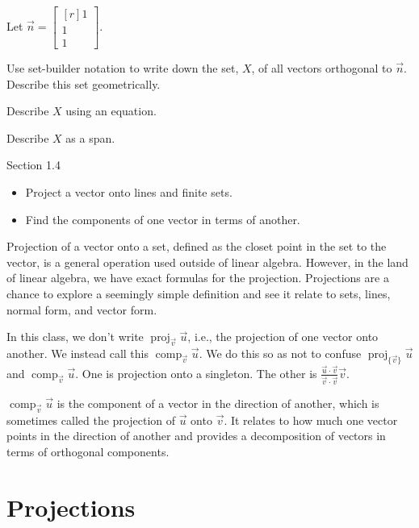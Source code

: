 \documentclass{problemset}
\DeclareMathOperator{\Comp}{comp}
\DeclareMathOperator{\Proj}{proj}
\newcommand{\mat}[1]{\begin{bmatrix*}[r]#1\end{bmatrix*}}
\begin{document}
	\question
	Let $\vec n=\mat{1\\1\\1}$.
	\begin{parts}
		\item Use set-builder notation to write down the set, $X$, of
			all vectors orthogonal to $\vec n$. Describe this set
			geometrically.
		\item Describe $X$ using an equation.
		\item Describe $X$ as a span.
	\end{parts}


\begin{lesson}
	\newpage

	Section 1.4

	\begin{itemize}
		\item Project a vector onto lines and finite sets.
		\item Find the components of one vector in terms of another.
	\end{itemize}

	Projection of a vector onto a set, defined as the closet point in the
	set to the vector, is a general operation used outside of linear algebra.
	However, in the land of linear algebra, we have exact formulas for the
	projection. Projections are a chance to explore a seemingly simple definition
	and see it relate to sets, lines, normal form, and vector form.

	\begin{annotation}
		\begin{notes}
			In this class, we don't write $\Proj_{\vec v}\vec u$,
			i.e., the projection of one vector onto another. We
			instead call this $\Comp_{\vec v}\vec u$. We do this so
			as not to confuse $\Proj_{\{\vec v\}}\vec u$ and
			$\Comp_{\vec v}\vec u$. One is projection onto a singleton.
			The other is $\frac{\vec u\cdot \vec v}{\vec v\cdot \vec v}\vec v$.
		\end{notes}
	\end{annotation}
	$\Comp_{\vec v}\vec u$ is the component of a vector in the direction of another, 
	which is sometimes called the projection of $\vec u$ onto $\vec v$. It relates
	to how much one vector points in the direction of another and
	provides a decomposition of vectors in terms of orthogonal components. 
	

	\newpage
\end{lesson}
\section*{Projections}
	
\end{document}
